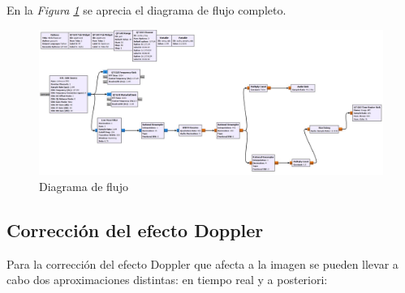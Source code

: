\documentclass[a4paper,openright,12pt]{article}
\begin{document}
	 En la \textit{Figura \ref{diagrama_completo}} se aprecia el diagrama de flujo completo.
	
	\begin{figure}[hbtp]
 \centering
 \includegraphics[width = 17cm]{imagenes/diagrama_flujo_completo.JPG}
 \caption{Diagrama de flujo}
 \label{diagrama_completo}
 \end{figure}




	\subsection{Corrección del efecto Doppler}

	Para la corrección del efecto Doppler que afecta a la imagen se pueden llevar a cabo dos aproximaciones distintas: en tiempo real y a posteriori:
	
\end{document}
